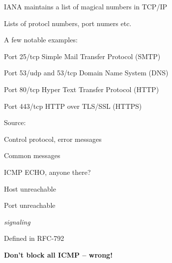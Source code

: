 \documentclass[Screen16to9,17pt]{foils}
\begin{document}


\begin{list1}
\item IANA maintains a list of magical numbers in TCP/IP
\item Lists of protocl numbers, port numers etc.
\item A few notable examples:
\begin{list2}
\item Port 25/tcp Simple Mail Transfer Protocol (SMTP)
\item Port 53/udp and 53/tcp Domain Name System (DNS)
\item Port 80/tcp Hyper Text Transfer Protocol (HTTP)
\item Port 443/tcp HTTP over TLS/SSL (HTTPS)
\end{list2}
\item Source: 
\end{list1}




\begin{list1}
\item Control protocol, error messages
\item Common messages
\begin{list2}
\item ICMP ECHO, anyone there?
\item Host unreachable
\item Port unreachable
\end{list2}
\item \emph{signaling}
\item Defined in RFC-792
\end{list1}

\centerline{\bf Don't block all ICMP -- wrong!}

\end{document}
